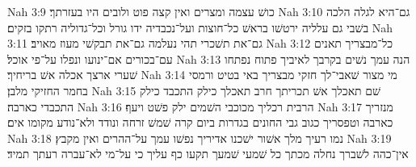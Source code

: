 Nah 3:9  כושׁ עצמה ומצרים ואין קצה פוט ולובים היו בעזרתך׃
Nah 3:10  גם־היא לגלה הלכה בשׁבי גם עלליה ירטשׁו בראשׁ כל־חוצות ועל־נכבדיה ידו גורל וכל־גדוליה רתקו בזקים׃
Nah 3:11  גם־את תשׁכרי תהי נעלמה גם־את תבקשׁי מעוז מאויב׃
Nah 3:12  כל־מבצריך תאנים עם־בכורים אם־ינועו ונפלו על־פי אוכל׃
Nah 3:13  הנה עמך נשׁים בקרבך לאיביך פתוח נפתחו שׁערי ארצך אכלה אשׁ בריחיך׃
Nah 3:14  מי מצור שׁאבי־לך חזקי מבצריך באי בטיט ורמסי בחמר החזיקי מלבן׃
Nah 3:15  שׁם תאכלך אשׁ תכריתך חרב תאכלך כילק התכבד כילק התכבדי כארבה׃
Nah 3:16  הרבית רכליך מכוכבי השׁמים ילק פשׁט ויעף׃
Nah 3:17  מנזריך כארבה וטפסריך כגוב גבי החונים בגדרות ביום קרה שׁמשׁ זרחה ונודד ולא־נודע מקומו אים׃
Nah 3:18  נמו רעיך מלך אשׁור ישׁכנו אדיריך נפשׁו עמך על־ההרים ואין מקבץ׃
Nah 3:19  אין־כהה לשׁברך נחלה מכתך כל שׁמעי שׁמעך תקעו כף עליך כי על־מי לא־עברה רעתך תמיד׃


